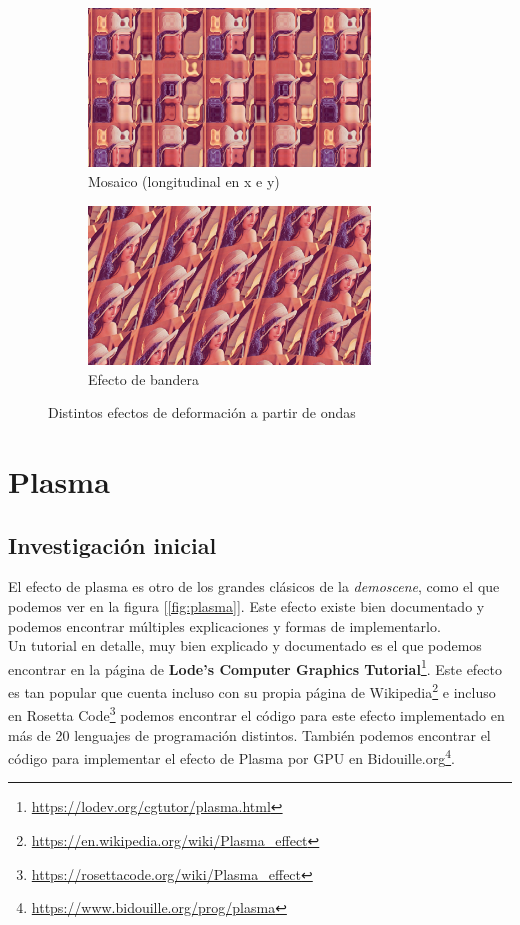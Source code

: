 \begin{figure}\ContinuedFloat
	\centering
	\begin{subfigure}[b]{0.48\textwidth}
		\centering
		\includegraphics[width=7.5cm]{archivos/deformation5}
		\caption{Mosaico (longitudinal en x e y)}
	\end{subfigure}
	\begin{subfigure}[b]{0.48\textwidth}
		\centering
		\includegraphics[width=7.5cm]{archivos/deformation6}
		\caption{Efecto de bandera}
	\end{subfigure}
	\caption{Distintos efectos de deformación a partir de ondas}
	\label{fig:alldeformations}
\end{figure}

\section{Plasma}

\subsection{Investigación inicial}

El efecto de plasma es otro de los grandes clásicos de la \emph{demoscene}, como el que podemos ver en la figura [\ref{fig:plasma}]. Este efecto existe bien documentado y podemos encontrar múltiples explicaciones y formas de implementarlo.\\

Un tutorial en detalle, muy bien explicado y documentado es el que podemos encontrar en la página de \textbf{Lode's Computer Graphics Tutorial}\footnote{\url{https://lodev.org/cgtutor/plasma.html}}. Este efecto es tan popular que cuenta incluso con su propia página de Wikipedia\footnote{\url{https://en.wikipedia.org/wiki/Plasma_effect}} e incluso en Rosetta Code\footnote{\url{https://rosettacode.org/wiki/Plasma_effect}} podemos encontrar el código para este efecto implementado en más de 20 lenguajes de programación distintos. También podemos encontrar el código para implementar el efecto de Plasma por GPU en Bidouille.org\footnote{\url{https://www.bidouille.org/prog/plasma}}.\\

